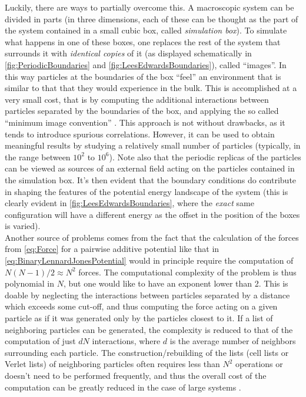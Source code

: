 Luckily, there are ways to partially overcome this. A macroscopic system can be divided in parts (in three dimensions, each of these can be thought as the part of the system contained in a small cubic box, called \emph{simulation box}). To simulate what happens in one of these boxes, one replaces the rest of the system that surrounds it with \emph{identical copies} of it (as displayed schematically in \autoref{fig:PeriodicBoundaries} and \autoref{fig:LeesEdwardsBoundaries}), called ``images''. 
In this way particles at the boundaries of the box ``feel'' an environment that is similar to that that they would experience in the bulk. This is accomplished at a very small cost, that is by computing the additional interactions between particles separated by the boundaries of the box, and applying the so called ``minimum image convention'' \cite{frenkel2001understanding}. This approach is not without drawbacks, as it tends to introduce spurious correlations. However, it can be used to obtain meaningful results by studying a relatively small number of particles (typically, in the range between $10^{2}$ to $10^{6}$).
Note also that the periodic replicas of the particles can be viewed as sources of an external field acting on the particles contained in the simulation box. It's then evident that the boundary conditions do contribute in shaping the features of the potential energy landscape of the system (this is clearly evident in \autoref{fig:LeesEdwardsBoundaries}, where the \emph{exact} same configuration will have a different energy as the offset in the position of the boxes is varied). \\
Another source of problems comes from the fact that the calculation of the forces from \autoref{eq:Force} for a pairwise additive potential like that in \autoref{eq:BinaryLennardJonesPotential} would in principle require the computation of $N(N-1)/2 \approx N^{2}$ forces. The computational complexity of the problem is thus polynomial in $N$, but one would like to have an exponent lower than 2. This is doable by neglecting the interactions between particles separated by a distance which exceeds some cut-off, and thus computing the force acting on a given particle as if it was generated only by the particles closest to it. If a list of neighboring particles can be generated, the complexity is reduced to that of the computation of just $d N$ interactions, where $d$ is the average number of neighbors surrounding each particle. The construction/rebuilding of the lists (cell lists or Verlet lists) \cite{frenkel2001understanding} of neighboring particles often requires less than $N^{2}$ operations or doesn't need to be performed frequently, and thus the overall cost of the computation can be greatly reduced in the case of large systems \cite{frenkel2001understanding}.  

